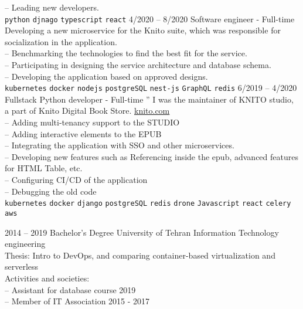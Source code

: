 \documentclass[9pt]{developercv}
\begin{document}
\begin{entrylist}
{		-- Leading new developers. \\
		\texttt{python}\slashsep
		\texttt{djnago}\slashsep
		\texttt{typescript}\slashsep
		\texttt{react}\slashsep
	}
	\entry
	{4/2020 -- 8/2020}
	{Software engineer - Full-time}
	{}
	{
		Developing a new microservice for the Knito suite, which was responsible for socialization in the application.\\
		-- Benchmarking the technologies to find the best fit for the service. \\
		-- Participating in designing the service architecture and database schema. \\
		-- Developing the application based on approved designs. \\
		\texttt{kubernetes}\slashsep
		\texttt{docker}\slashsep
		\texttt{nodejs}\slashsep
		\texttt{postgreSQL}\slashsep
		\texttt{nest-js}\slashsep
		\texttt{GraphQL}\slashsep
		\texttt{redis}\slashsep
	}
	\entry
	{6/2019 -- 4/2020}
	{Fullstack Python developer - Full-time}
	{''}
	{
		I was the maintainer of KNITO studio, a part of Knito Digital Book Store.
		\href{https://knito.com/}{knito.com} \\
		-- Adding multi-tenancy support to the STUDIO \\
		-- Adding interactive elements to the EPUB \\
		-- Integrating the application with SSO and other microservices. \\
		-- Developing new features such as Referencing inside the epub, advanced features for HTML Table, etc. \\
		-- Configuring CI/CD of the application \\
		-- Debugging the old code \\
		\texttt{kubernetes}\slashsep
		\texttt{docker}\slashsep
		\texttt{django}\slashsep
		\texttt{postgreSQL}\slashsep
		\texttt{redis}\slashsep
		\texttt{drone}\slashsep
		\texttt{Javascript}\slashsep
		\texttt{react}\slashsep
		\texttt{celery}\slashsep
		\texttt{aws}\slashsep
	}
\end{entrylist}

\begin{entrylist}
	\entry
	{2014 -- 2019}
	{Bachelor's Degree}
	{University of Tehran}
	{
		Information Technology engineering \\
		Thesis: Intro to DevOps, and comparing container-based virtualization and serverless \\
		Activities and societies: \\
		-- Assistant for database course 2019 \\
		-- Member of IT Association 2015 - 2017 \\
	}
\end{entrylist}
\end{document}
